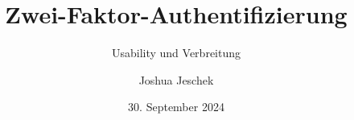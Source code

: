 \newcommand{\organization}{
    Technische Universität Chemnitz \\
    Fakultät Informatik \\
    Professur Medieninformatik \\
}
\newcommand{\type}{Hauptseminar}
\newcommand{\theauthor}{Joshua Jeschek}
\newcommand{\thetitle}{Zwei-Faktor-Authentifizierung}
\newcommand{\thesubtitle}{Usability und Verbreitung}
\newcommand{\pruefer}{Dr. Thomas Wilhelm-Stein}
\newcommand{\place}{München}
\date{30. September 2024}

\author{\theauthor}
\title{\thetitle}
\subtitle{\thesubtitle}
